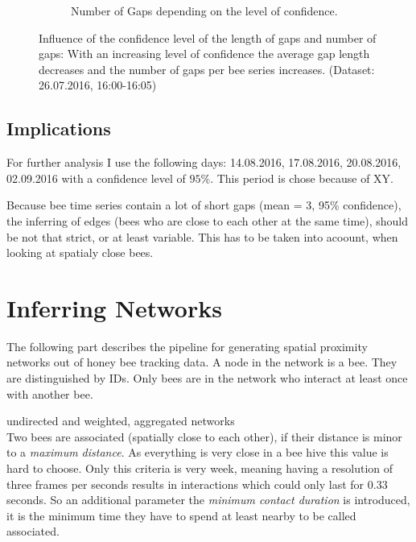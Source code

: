 \begin{figure}
\begin{subfigure}[b]{0.45\textwidth}
		\caption[Number of Gaps]{Number of Gaps depending on the level of confidence.}
		\label{fig:numgaps}
	\end{subfigure}
	\caption[Influence of Confidence Level on Gaps]{Influence of the confidence level of the length of gaps and number of gaps: With an increasing level of confidence the average gap length decreases and the number of gaps per bee series increases. (Dataset: 26.07.2016, 16:00-16:05)}
	\label{fig:gaps}
\end{figure}

\clearpage

\subsection{Implications}
For further analysis I use the following days: 14.08.2016, 17.08.2016, 20.08.2016, 02.09.2016 with a confidence level of $95\%$. This period is chose because of XY.

Because bee time series contain a lot of short gaps (mean = 3, 95\% confidence), the inferring of edges (bees who are close to each other at the same time), should be not that strict, or at least variable. This has to be taken into acoount, when looking at spatialy close bees.






\clearpage
\section{Inferring Networks}

The following part describes the pipeline for generating spatial proximity networks out of honey bee tracking data. A node in the network is a bee. They are distinguished by IDs. Only bees are in the network who interact at least once with another bee.

undirected and weighted, aggregated networks\\

Two bees are associated (spatially close to each other), if their distance is minor to a \emph{maximum distance}. As everything is very close in a bee hive this value is hard to choose. Only this criteria is very week, meaning having a resolution of three frames per seconds results in interactions which could only last for $0.33$ seconds. So an additional parameter the \emph{minimum contact duration} is introduced, it is the minimum time they have to spend at least nearby to be called associated.


